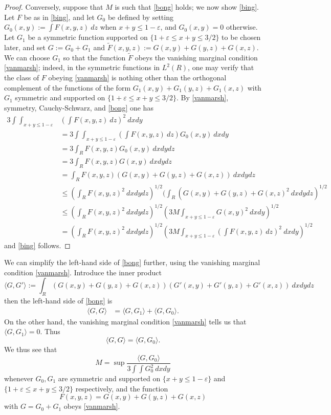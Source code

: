 \documentclass[12pt,a4paper,reqno]{amsart}
\numberwithin{equation}{section}
\theoremstyle{plain}
\theoremstyle{definition}
\newcommand\eps{\varepsilon}
\begin{document}
\begin{proof}
Conversely, suppose that $M$ is such that \eqref{bong} holds; we now show \eqref{bing}. Let $F$ be as in \eqref{bing}, and let $G_0$ be defined by setting $G_0(x,y) := \int F(x,y,z)\ dz$ when $x+y \leq 1-\eps$, and $G_0(x,y)=0$ otherwise. Let $G_1$ be a symmetric function supported on $\{ 1+\eps \leq x+y \leq 3/2\}$ to be chosen later, and set $G := G_0+G_1$ and $\tilde F(x,y,z) := G(x,y) + G(y,z) + G(x,z)$.  We can choose $G_1$ so that the function $\tilde F$ obeys the vanishing marginal condition \eqref{vanmarsh}; indeed, in the symmetric functions in $L^2(R)$, one may verify that the class of $F$ obeying \eqref{vanmarsh} is nothing other than the orthogonal complement of the functions of the form $G_1(x,y)+G_1(y,z)+G_1(x,z)$ with $G_1$ symmetric and supported on $\{ 1+\eps \leq x+y \leq 3/2\}$.
By \eqref{vanmarsh}, symmetry, Cauchy-Schwarz, and \eqref{bong} one has
\begin{align*}
3 \int\int_{x+y \leq 1-\eps} &(\int F(x,y,z)\ dz)^2\ dx dy \\
&=
3 \int\int_{x+y \leq 1-\eps} (\int F(x,y,z)\ dz) G_0(x,y)\ dx dy \\
&= 3 \int_R F(x,y,z) G_0(x,y)\ dx dy dz\\
&= 3 \int_R F(x,y,z) G(x,y)\ dx dy dz\\
&= \int_R F(x,y,z) (G(x,y)+G(y,z)+G(x,z))\ dx dy dz\\
&\leq (\int_R F(x,y,z)^2\ dx dy dz)^{1/2} (\int_R (G(x,y)+G(y,z)+G(x,z)^2\ dx dy dz)^{1/2}\\
&\leq (\int_R F(x,y,z)^2\ dx dy dz)^{1/2} (3M \int_{x+y \leq 1-\eps} G(x,y)^2\ dx dy)^{1/2}\\
&= (\int_R F(x,y,z)^2\ dx dy dz)^{1/2} (3M \int_{x+y \leq 1-\eps} (\int F(x,y,z)\ dz)^2\ dx dy)^{1/2}
\end{align*}
and \eqref{bing} follows.
\end{proof}

We can simplify the left-hand side of \eqref{bong} further, using the vanishing marginal condition \eqref{vanmarsh}.  Introduce the inner product
$$ \langle G, G' \rangle := \int_R (G(x,y)+G(y,z)+G(x,z)) (G'(x,y) + G'(y,z) + G'(x,z))\ dx dy dz$$
then the left-hand side of \eqref{bong} is
\begin{align*}
\langle G,G \rangle &= \langle G, G_1 \rangle + \langle G,G_0 \rangle.
\end{align*}
On the other hand, the vanishing marginal condition \eqref{vanmarsh} tells us that $\langle G, G_1 \rangle = 0$.  Thus
$$
\langle G, G \rangle = \langle G, G_0 \rangle.$$
We thus see that 
$$ M = \sup \frac{ \langle G, G_0 \rangle}{ 3 \int\int G_0^2\ dx dy }$$
whenever $G_0, G_1$ are symmetric and supported on $\{ x+y \leq 1-\eps\}$ and $\{ 1+\eps \leq x+y \leq 3/2\}$ respectively, and the function
$$ F(x,y,z) = G(x,y) + G(y,z) + G(x,z)$$
with $G=G_0+G_1$ obeys \eqref{vanmarsh}.
\end{document}
